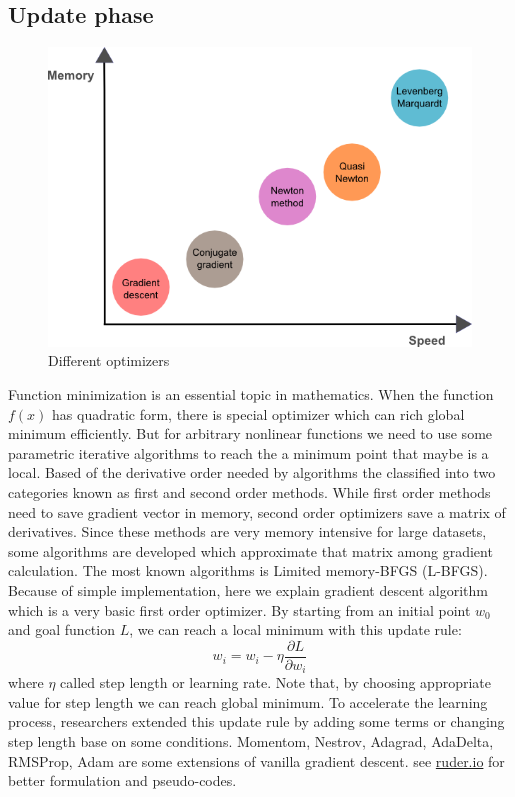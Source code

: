 \documentclass[10pt]{SelfArx} %
\begin{document}
\subsection{Update phase}
\begin{figure}\centering 
	\includegraphics[width=\linewidth]{img/optimizer}
	\caption{Different optimizers}
\end{figure}
Function minimization is an essential topic in mathematics. When the function $f(x)$ has quadratic form, there is special optimizer which can rich global minimum efficiently. But for arbitrary nonlinear functions we need to use some parametric iterative algorithms to reach the a minimum point that maybe is a local. Based of the derivative order needed by algorithms the classified into two categories known as first and second order methods. While first order methods need to save gradient vector in memory, second order optimizers save a matrix of derivatives. Since these methods are very memory intensive for large datasets, some algorithms are developed which approximate that matrix among gradient calculation. The most known algorithms is Limited memory-BFGS (L-BFGS). Because of simple implementation, here we explain gradient descent algorithm which is a very basic first order optimizer.
By starting from an initial point $w_0$ and goal function $L$, we can reach a local minimum with this update rule:
\begin{equation}
w_i = w_i - \eta \frac{\partial L}{\partial w_i}
\end{equation}
where $\eta$ called step length or learning rate. Note that, by choosing appropriate value for step length we can reach global minimum. To accelerate the learning process, researchers extended this update rule by adding some terms or changing step length base on some conditions. Momentom, Nestrov, Adagrad, AdaDelta, RMSProp, Adam are some extensions of vanilla gradient descent. see \href{https://ruder.io/optimizing-gradient-descent/}{ruder.io} for better formulation and pseudo-codes.
\end{document}
